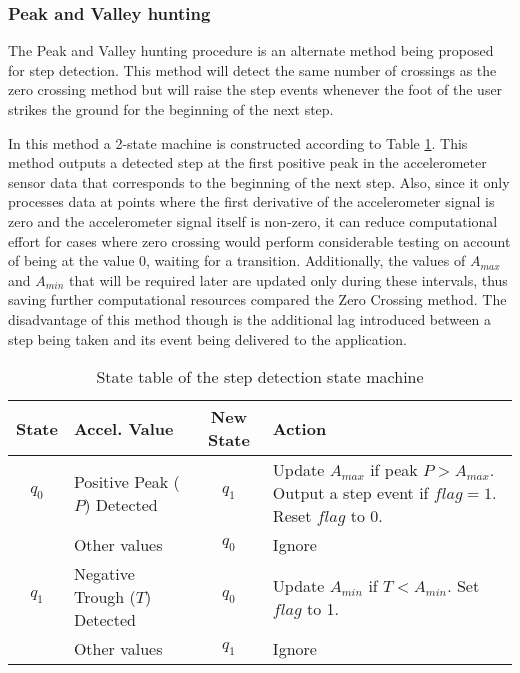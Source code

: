 \subsubsection{Peak and Valley hunting\label{sec:peak_and_valley}}

The Peak and Valley hunting procedure is an alternate method being
proposed for step detection.
This method will detect the same number of crossings as the zero crossing 
method but will raise the step events whenever the foot of the user 
strikes the ground for the beginning of the next step. 

In this method a 2-state machine is constructed according to Table
\ref{tbl:peak_valley_state_table}. This method outputs a detected step at 
the first positive peak in the accelerometer sensor data that corresponds to 
the beginning of the next step. Also, since it only processes data at 
points where the first derivative of the accelerometer signal is zero and 
the accelerometer signal itself is non-zero, it can reduce computational 
effort for cases where zero crossing would perform considerable testing
on account of being at the value 0, waiting for a transition. Additionally,
the values of $A_{max}$ and $A_{min}$ that will be required later are 
updated only during these intervals, thus saving further computational 
resources compared the Zero Crossing method. The disadvantage of this method
though is the additional lag introduced between a step being taken and its 
event being delivered to the application.

\begin{table}[h]\centering
    \begin{tabular}{c p{1in} c p{2.7in}} \hline
    State & Accel. Value     & New State &  Action\\     \hline
    $q_0$ & Positive Peak ($P$) Detected  & $q_1$     & Update $A_{max}$ if peak $P > A_{max}$. Output a step event if $flag = 1$. Reset $flag$ to 0.  \\ 
          & Other values            & $q_0$     & Ignore \\         \hline
    $q_1$ & Negative Trough ($T$) Detected & $q_0$    & Update $A_{min}$ if $T < A_{min}$. Set $flag$ to 1. \\
          & Other values            & $q_1$     & Ignore \\ \hline
    \end{tabular}
    \caption{State table of the step detection state machine\label{tbl:peak_valley_state_table}}
\end{table}

